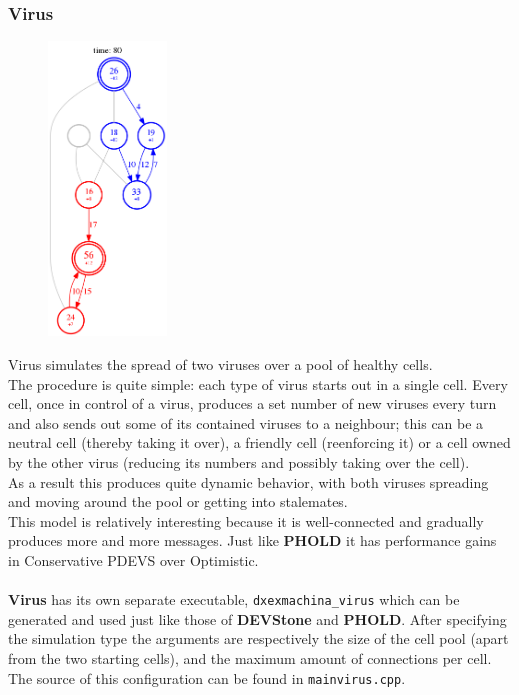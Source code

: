 \documentclass[8pt,a4paper]{report}
\begin{document}
\subsubsection{Virus}
\begin{figure}
  \begin{center}
    \includegraphics[width=0.28\textwidth]{virus}
  \end{center}
\end{figure}

Virus simulates the spread of two viruses over a pool of healthy cells.\\

The procedure is quite simple: each type of virus starts out in a single cell. Every cell, once in control of a virus, produces a set number of new viruses every turn and also sends out some of its contained viruses to a neighbour; this can be a neutral cell (thereby taking it over), a friendly cell (reenforcing it) or a cell owned by the other virus (reducing its numbers and possibly taking over the cell).\\
As a result this produces quite dynamic behavior, with both viruses spreading and moving around the pool or getting into stalemates.\\

This model is relatively interesting because it is well-connected and gradually produces more and more messages. Just like \textbf{PHOLD} it has performance gains in Conservative PDEVS over Optimistic.\\
\\
\textbf{Virus} has its own separate executable, \texttt{dxexmachina\_virus} which can be generated and used just like those of \textbf{DEVStone} and \textbf{PHOLD}. After specifying the simulation type the arguments are respectively the size of the cell pool (apart from the two starting cells), and the maximum amount of connections per cell.\\
The source of this configuration can be found in \texttt{mainvirus.cpp}.
\end{document}
